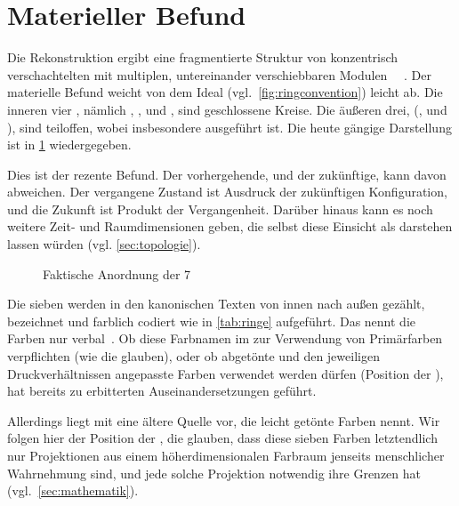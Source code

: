 \section{Materieller Befund}%
%

Die Rekonstruktion ergibt eine fragmentierte Struktur von konzentrisch verschachtelten  mit multiplen, untereinander verschiebbaren Modulen ~\cite{cbasebook}~\cite{cbasepressemap}. 
Der materielle Befund weicht von dem Ideal (vgl.~\cref{fig:ringconvention}) leicht ab. Die inneren vier , nämlich , ,  und , sind geschlossene Kreise. Die äußeren drei, (,  und ), sind teiloffen, wobei insbesondere   ausgeführt ist. Die heute gängige Darstellung ist in \cref{fig:cbaselogo} wiedergegeben.

Dies ist der rezente Befund. Der vorhergehende, und der zukünftige, kann davon abweichen. Der vergangene Zustand ist Ausdruck der zukünftigen Konfiguration, und die Zukunft ist Produkt der Vergangenheit. Darüber hinaus kann es noch weitere Zeit- und Raumdimensionen geben, die selbst diese Einsicht als  darstehen lassen würden (vgl. \cref{sec:topologie}).


\begin{figure}[ht!]
    \centering
        \resizebox{0.6\textwidth}{!}{
        
    }
    \caption{Faktische Anordnung der 7 }
    \label{fig:cbaselogo}
\end{figure}


    Die sieben   werden in den kanonischen Texten von innen nach außen gezählt, bezeichnet und  farblich codiert wie in  \cref{tab:ringe} aufgeführt. Das  nennt die Farben nur verbal~\cite[S.49]{cbasebook}. Ob diese Farbnamen im  zur Verwendung von Primärfarben verpflichten (wie die  glauben), oder ob abgetönte und den jeweiligen Druckverhältnissen angepasste Farben verwendet werden dürfen (Position der ), hat bereits zu erbitterten Auseinandersetzungen geführt. 
    
    Allerdings liegt mit  \cite{cbasefarbschema}  eine ältere Quelle vor, die leicht getönte Farben nennt. Wir folgen hier der Position der , die glauben, dass diese sieben Farben letztendlich nur Projektionen aus einem höherdimensionalen Farbraum jenseits menschlicher Wahrnehmung sind, und jede solche Projektion notwendig ihre Grenzen hat (vgl.~\cref{sec:mathematik}). 
    
